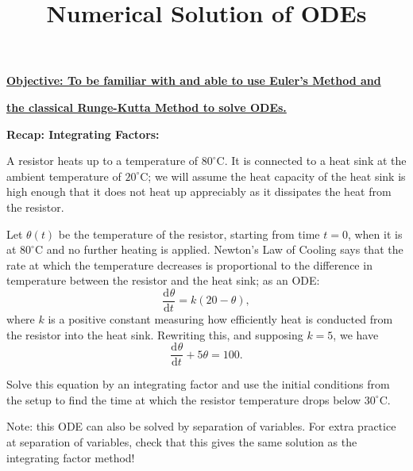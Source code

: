 \documentclass{article}
\newcommand{\deriv}[3][]{\frac{\mathrm{d}^{#1}#2}{\mathrm{d}#3^{#1}}}
\begin{document}
\title{Numerical Solution of ODEs}
\date{}

\maketitle
\thispagestyle{empty}

\Large

\textbf{\underline{Objective: To be familiar with and able to use Euler's Method and}}

\textbf{\underline{the classical Runge-Kutta Method to solve ODEs.}}







\vspace{5mm}











\textbf{Recap: Integrating Factors:}\bigskip


A resistor heats up to a temperature of $80^\circ\mathrm{C}$. It is connected to a heat sink at the ambient temperature of $20^\circ\mathrm{C}$; we will assume the heat capacity of the heat sink is high enough that it does not heat up appreciably as it dissipates the heat from the resistor.

Let $\theta(t)$ be the temperature of the resistor, starting from time $t=0$, when it is at $80^\circ\mathrm{C}$ and no further heating is applied. Newton's Law of Cooling says that the rate at which the temperature decreases is proportional to the difference in temperature between the resistor and the heat sink; as an ODE:
\[\deriv{\theta}{t} = k(20-\theta),\]
where $k$ is a positive constant measuring how efficiently heat is conducted from the resistor into the heat sink. Rewriting this, and supposing $k=5$, we have
\[\deriv{\theta}{t}+5\theta = 100.\]

Solve this equation by an integrating factor and use the initial conditions from the setup to find the time at which the resistor temperature drops below $30^\circ\mathrm{C}$.\bigskip



Note: this ODE can also be solved by separation of variables. For extra practice at separation of variables, check that this gives the same solution as the integrating factor method!
\end{document}
